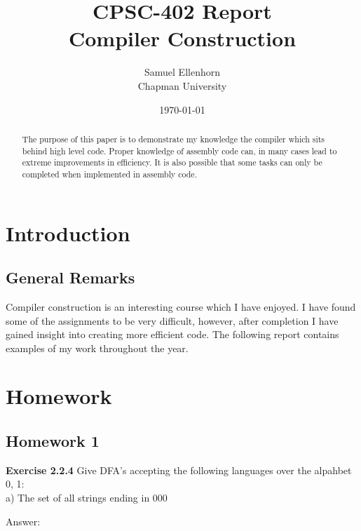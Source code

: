 \documentclass{article}
\title{CPSC-402 Report\\Compiler Construction}
\author{Samuel Ellenhorn  \\ Chapman University}
\date{\today}
\theoremstyle{theorem}
\theoremstyle{definition}
\theoremstyle{remark}
\begin{document}
\maketitle

\begin{abstract}
The purpose of this paper is to demonstrate my knowledge the compiler which sits behind high level code. Proper knowledge of assembly code can, in many cases lead to extreme improvements in efficiency. It is also possible that some tasks can only be completed when implemented in assembly code. 
\end{abstract}

\tableofcontents

\section{Introduction}\label{intro}



\subsection{General Remarks}
Compiler construction is an interesting course which I have enjoyed. I have found some of the assignments to be very difficult, however, after completion I have gained insight into creating more efficient code. The following report contains examples of my work throughout the year.

 

\medskip\noindent



\section{Homework}\label{homework}



\subsection{Homework 1}

\textbf{Exercise 2.2.4} Give DFA's accepting the following languages over the alpahbet {0, 1}:\\
 a) The set of all strings ending in 000\\
 
  \begin{center}
     Answer:
 \end{center}
 
\end{document}
